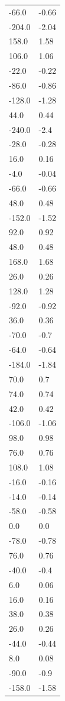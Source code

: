\begin{longtable}{ll}
-66.0 & -0.66 \\
-204.0 & -2.04 \\
158.0 & 1.58 \\
106.0 & 1.06 \\
-22.0 & -0.22 \\
-86.0 & -0.86 \\
-128.0 & -1.28 \\
44.0 & 0.44 \\
-240.0 & -2.4 \\
-28.0 & -0.28 \\
16.0 & 0.16 \\
-4.0 & -0.04 \\
-66.0 & -0.66 \\
48.0 & 0.48 \\
-152.0 & -1.52 \\
92.0 & 0.92 \\
48.0 & 0.48 \\
168.0 & 1.68 \\
26.0 & 0.26 \\
128.0 & 1.28 \\
-92.0 & -0.92 \\
36.0 & 0.36 \\
-70.0 & -0.7 \\
-64.0 & -0.64 \\
-184.0 & -1.84 \\
70.0 & 0.7 \\
74.0 & 0.74 \\
42.0 & 0.42 \\
-106.0 & -1.06 \\
98.0 & 0.98 \\
76.0 & 0.76 \\
108.0 & 1.08 \\
-16.0 & -0.16 \\
-14.0 & -0.14 \\
-58.0 & -0.58 \\
0.0 & 0.0 \\
-78.0 & -0.78 \\
76.0 & 0.76 \\
-40.0 & -0.4 \\
6.0 & 0.06 \\
16.0 & 0.16 \\
38.0 & 0.38 \\
26.0 & 0.26 \\
-44.0 & -0.44 \\
8.0 & 0.08 \\
-90.0 & -0.9 \\
-158.0 & -1.58 \\

\end{longtable}
